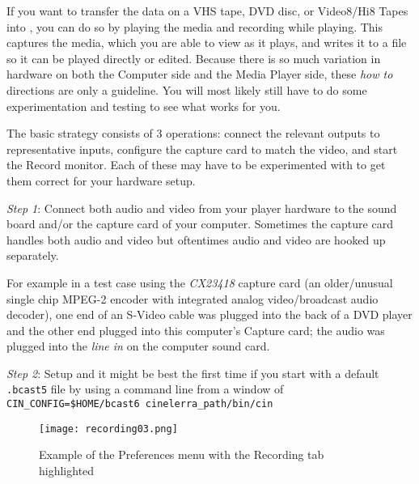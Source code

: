 If you want to transfer the data on a VHS tape, DVD disc, or Video8/Hi8 Tapes into \CGG{}, you
can do so by playing the media and recording while playing.  This captures the media, which you
are able to view as it plays, and writes it to a file so it can be played directly or edited.
Because there is so much variation in hardware on both the Computer side and the Media Player side,
these \textit{how to} directions are only a guideline.  You will most likely still have to do some
experimentation and testing to see what works for you.

The basic strategy consists of 3 operations:  connect the relevant outputs to representative inputs, configure the capture card to match the video, and start the Record monitor.  Each of these may have to be experimented with to get them correct for your hardware setup.

\textit{Step 1}: Connect both audio and video from your player hardware to the sound board and/or the capture card of your computer.  Sometimes the capture card handles both audio and video but oftentimes audio and video are hooked up separately.

For example in a test case using the \textit{CX23418} capture card (an older/unusual single chip MPEG-2 encoder with integrated analog video/broadcast audio decoder), one end of an S-Video cable was plugged into the back of a DVD player and the other end plugged into this computer’s Capture card; the audio was plugged into the \textit{line in} on the computer sound card.

\textit{Step 2}: Setup \CGG{} and it might be best the first time if you start with a default \texttt{.bcast5} file by using a
command line from a window of \\
\texttt{CIN\_CONFIG=\$HOME/bcast6 {cinelerra\_path}/bin/cin}

\begin{figure}[htpb]
	\centering
	\texttt{[image: recording03.png]}
	\caption{Example of the Preferences menu with the Recording tab highlighted}
	\label{fig:recordingx}
\end{figure}

